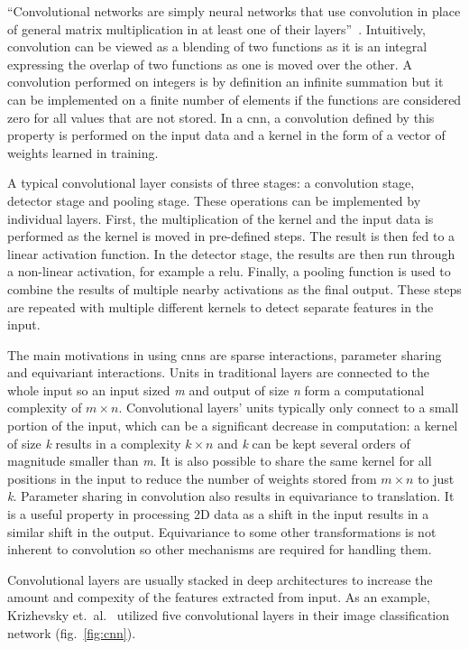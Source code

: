 ``Convolutional networks are simply neural networks that use convolution in place of
general matrix multiplication in at least one of their layers''~\cite{DEEP_LEARNING}.
Intuitively, convolution can be viewed as a blending of two functions as it is an
integral expressing the overlap of two functions as one is moved over the other.
A convolution performed on integers is by definition an infinite summation but it
can be implemented on a finite number of elements if the functions are considered
zero for all values that are not stored. In a \ac{cnn}, a convolution defined by this
property is performed on the input data and a kernel in the form of a vector of weights
learned in training.

A typical convolutional layer consists of three stages: a convolution stage, detector
stage and pooling stage. These operations can be implemented by individual layers. First,
the multiplication of the kernel and the input data is performed as the kernel is moved in
pre-defined steps. The result is then fed to a linear activation function. In the detector stage,
the results are then run through a non-linear activation, for example a \ac{relu}. Finally,
a pooling function is used to combine the results of multiple nearby activations as the
final output. These steps are repeated with multiple different kernels to detect separate
features in the input.

The main motivations in using \ac{cnn}s are sparse interactions, parameter sharing
and equivariant interactions. Units in traditional layers are connected to the whole
input so an input sized \textit{m} and output of size \textit{n} form a computational
complexity of $m \times n$. Convolutional layers' units typically only connect to a small
portion of the input, which can be a significant decrease in computation: a kernel of
size \textit{k} results in a complexity $k \times n$ and \textit{k} can be kept several
orders of magnitude smaller than \textit{m}. It is also possible to share the same kernel
for all positions in the input to reduce the number of weights stored from $m \times n$
to just \textit{k}. Parameter sharing in convolution also results in equivariance to
translation. It is a useful property in processing 2D data as a shift in the input
results in a similar shift in the output. Equivariance to some other transformations is not
inherent to convolution so other mechanisms are required for handling them.

Convolutional layers are usually stacked in deep architectures to increase the amount and
compexity of the features extracted from input. As an example, Krizhevsky et.~al.~\cite{NIPS_IMAGENET}
utilized five convolutional layers in their image classification network (fig.~\ref{fig:cnn}).

